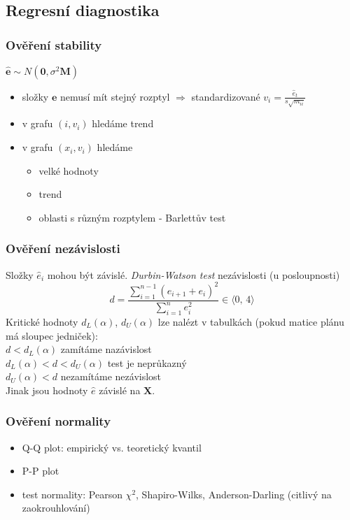 \documentclass[a4]{report}
\theoremstyle{definition}
\begin{document}
{%
\subsection{Regresní diagnostika}
\subsubsection{Ověření stability}
$\hat{\mathbf{e}} \sim N(\mathbf{0}, \sigma^{2} \mathbf{M})$

\begin{itemize}
    \item složky $\mathbf{e}$ nemusí mít stejný rozptyl $\Rightarrow$ standardizované $v_i = \frac{\hat{e}_t}{s \sqrt{m_{ii}}}$
    \item v grafu $(i, v_i)$ hledáme trend
    \item v grafu $(x_i, v_i)$ hledáme \begin{itemize}
    \item velké hodnoty
    \item trend
    \item oblasti s různým rozptylem - Barlettův test
    \end{itemize}
\end{itemize}
\subsubsection{Ověření nezávislosti}
Složky $\hat{e}_i$ mohou být závislé. 
\textit{Durbin-Watson test} nezávislosti (u posloupnosti) 
$$d = \frac{\sum_{i=1}^{n-1} \left( e_{i+1}+e_i\right) ^ 2}{\sum_{i=1}^{n} e_i ^ 2} \in \langle 0, \, 4 \rangle $$ Kritické hodnoty $d_L (\alpha)$, $d_U (\alpha)$ lze nalézt v tabulkách (pokud matice plánu má sloupec jedniček): \\
$d < d_L (\alpha)$ zamítáme nazávislost \\
$d_L (\alpha) < d < d_U (\alpha)$ test je neprůkazný \\
$d_U (\alpha) < d$ nezamítáme nezávislost \\
Jinak jsou hodnoty $\hat{e}$ závislé na $\mathbf{X}$. 

\subsubsection{Ověření normality}
\begin{itemize}
    \item Q-Q plot: empirický vs. teoretický kvantil 
    \item P-P plot
    \item test normality: Pearson $\chi ^2$, Shapiro-Wilks, Anderson-Darling (citlivý na zaokrouhlování) 
\end{itemize}

}
\end{document}
